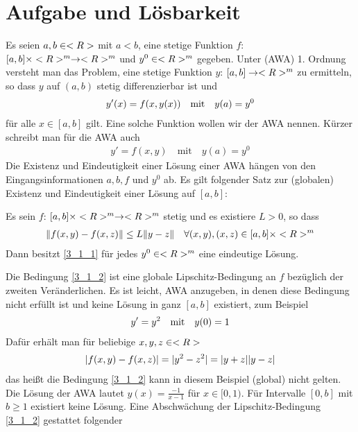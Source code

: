\section{Aufgabe und Lösbarkeit}

Es seien $a,b\in<R>$ mit $a<b$, eine stetige Funktion $f$: $[a,b]\times<R>^m\to<R>^m$ und $y^0\in<R>^m$ gegeben. Unter  (AWA) 1. Ordnung versteht man das Problem, eine stetige Funktion $y$: $[a,b]\to<R>^m$ zu ermitteln, so dass $y$ auf $(a,b)$ stetig differenzierbar ist und
\begin{align}
	y'(x) = f(x,y(x)) \quad\text{mit}\quad y(a)=y^0 \notag
\end{align}
für alle $x\in [a,b]$ gilt. Eine solche Funktion wollen wir  der AWA nennen. Kürzer schreibt man für die AWA auch
\begin{align}
	\label{3_1_1}
	y'=f(x,y) \quad\text{mit}\quad y(a)=y^0
\end{align}
Die Existenz und Eindeutigkeit einer Lösung einer AWA hängen von den Eingangsinformationen $a,b,f$ und $y^0$ ab. Es gilt folgender Satz zur (globalen) Existenz und Eindeutigkeit einer Lösung auf $[a,b]$:

\begin{proposition}
	Es sein $f$: $[a,b]\times <R>^m\to<R>^m$ stetig und es existiere $L>0$, so dass
	\begin{align}
		\label{3_1_2}
		\Vert f(x,y)-f(x,z)\Vert \le L\Vert y-z\Vert\quad\forall (x,y),(x,z)\in [a,b]\times <R>^m
	\end{align}
	Dann besitzt \cref{3_1_1} für jedes $y^0\in<R>^m$ eine eindeutige Lösung.
\end{proposition}

Die Bedingung \cref{3_1_2} ist eine globale Lipschitz-Bedingung an $f$ bezüglich der zweiten Veränderlichen. Es ist leicht, AWA anzugeben, in denen diese Bedingung nicht erfüllt ist und keine Lösung in ganz $[a,b]$ existiert, zum Beispiel
\begin{align}
	y'= y^2\quad\text{mit}\quad y(0)=1\notag
\end{align}
Dafür erhält man für beliebige $x,y,z\in<R>$
\begin{align}
	\vert f(x,y)-f(x,z)\vert = \vert y^2-z^2\vert = \vert y+z\vert\vert y-z\vert\notag
\end{align}
das heißt die Bedingung \cref{3_1_2} kann in diesem Beispiel (global) nicht gelten. Die Lösung der AWA lautet $y(x)=\frac{-1}{x-1}$ für $x\in[0,1)$. Für Intervalle $[0,b]$ mit $b\ge 1$ existiert keine Lösung. Eine Abschwächung der Lipschitz-Bedingung \cref{3_1_2} gestattet folgender


